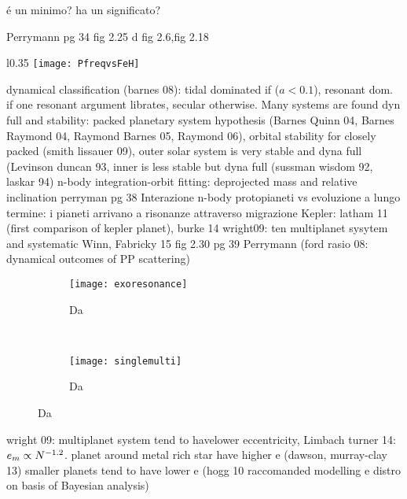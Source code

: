 \begin{workout}
\'e un minimo? ha un significato?
\end{workout}

\begin{workout}
Perrymann pg 34 fig 2.25 d
fig 2.6,fig 2.18
\end{workout}

\begin{wrapfigure}[5]{l}{0.35\textwidth}
\texttt{[image: PfreqvsFeH]}\label{fig:freqZstar}
\caption{Da \cite{mayor2011harps}}
\end{wrapfigure}

\begin{workout}
dynamical classification (barnes 08): tidal dominated if ($a<0.1$), resonant dom. if one resonant argument librates, secular otherwise.
Many systems are found dyn full and stability: packed planetary system hypothesis (Barnes Quinn 04, Barnes Raymond 04, Raymond Barnes 05, Raymond 06), orbital stability for closely packed (smith lissauer 09), outer solar system is very stable and dyna full (Levinson duncan 93, inner is less stable but dyna full (sussman wisdom 92, laskar 94)
n-body integration-orbit fitting: deprojected mass and relative inclination
perryman pg 38
Interazione n-body protopianeti vs evoluzione a lungo termine: i pianeti arrivano a risonanze attraverso migrazione
Kepler: latham 11 (first comparison of kepler planet), burke 14
wright09: ten multiplanet sysytem and systematic
Winn, Fabricky 15
fig 2.30 pg 39 Perrymann
(ford rasio 08: dynamical outcomes of PP scattering)

\begin{figure}[!ht]
\begin{subfigure}[b]{0.47\textwidth}
\centering
\texttt{[image: exoresonance]}
\caption{Da \cite{winnfabrycky15}}\label{fig:exoresonance}
\end{subfigure}
~
\begin{subfigure}[b]{0.47\textwidth}
\centering
\texttt{[image: singlemulti]}\label{fig:}
\caption{Da \cite{wright09}}
\end{subfigure}
\end{figure}
\end{workout}

\begin{workout}
wright 09: multiplanet system tend to havelower eccentricity,
Limbach turner 14: $e_m\propto N^{-1.2}$.
planet around metal rich star have higher e (dawson, murray-clay 13)
smaller planets tend to have lower e (hogg 10 raccomanded modelling e distro on basis of Bayesian analysis)
\end{workout}

